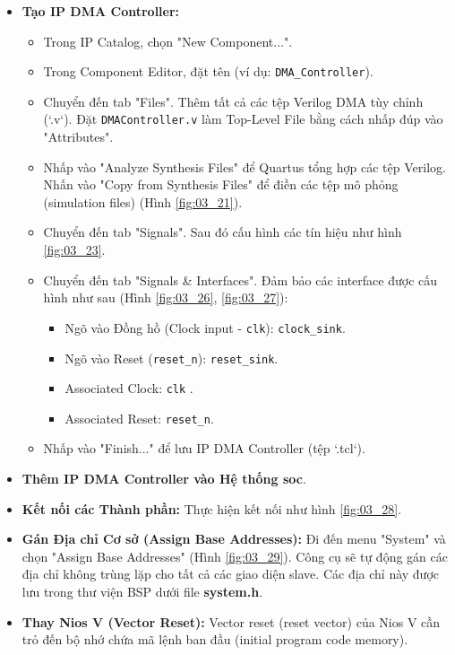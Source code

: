 \begin{enumerate}
\begin{itemize}
        \item \textbf{Tạo IP DMA Controller:}
        \begin{itemize}
            \item Trong IP Catalog, chọn "New Component...".
            \item Trong Component Editor, đặt tên (ví dụ: \texttt{DMA\_Controller}).
            \item Chuyển đến tab "Files". Thêm tất cả các tệp Verilog DMA tùy chỉnh (`.v`). Đặt \texttt{DMAController.v} làm Top-Level File bằng cách nhấp đúp vào "Attributes". 
            \item Nhấp vào "Analyze Synthesis Files" để Quartus tổng hợp các tệp Verilog. Nhấn vào "Copy from Synthesis Files" để điền các tệp mô phỏng (simulation files) (Hình \ref{fig:03_21}).
            \item Chuyển đến tab "Signals". Sau đó cấu hình các tín hiệu như hình \ref{fig:03_23}. 
            \item Chuyển đến tab "Signals \& Interfaces". Đảm bảo các interface được cấu hình như sau (Hình \ref{fig:03_26}, \ref{fig:03_27}):
            \begin{itemize}
                \item Ngõ vào Đồng hồ (Clock input - \texttt{clk}): \texttt{clock\_sink}.
                \item Ngõ vào Reset (\texttt{reset\_n}): \texttt{reset\_sink}.
                \item Associated Clock: \texttt{clk} .
                \item Associated Reset: \texttt{reset\_n}.
            \end{itemize}
            \item Nhấp vào "Finish..." để lưu IP DMA Controller (tệp `.tcl`).
        \end{itemize}
        \item \textbf{Thêm IP DMA Controller vào Hệ thống \acrshort{soc}}.
        \item \textbf{Kết nối các Thành phần:} Thực hiện kết nối như hình \ref{fig:03_28}.
        \item \textbf{Gán Địa chỉ Cơ sở (Assign Base Addresses):} Đi đến menu "System" và chọn "Assign Base Addresses" (Hình \ref{fig:03_29}). Công cụ sẽ tự động gán các địa chỉ không trùng lặp cho tất cả các giao diện slave. Các địa chỉ này được lưu trong thư viện BSP dưới file \textbf{system.h}.
        \item \textbf{Thay Nios V (Vector Reset):} Vector reset (reset vector) của Nios V cần trỏ đến bộ nhớ chứa mã lệnh ban đầu (initial program code memory). 

\end{itemize}
\end{enumerate}
